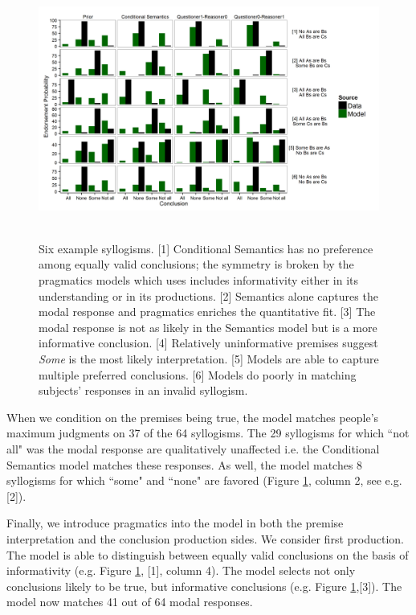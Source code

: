 \documentclass[10pt,letterpaper]{article}
\begin{document}
\begin{figure}
\centering
    \includegraphics[width=\textwidth,height=8.5cm]{fig1_multibar_qrm_alpha2}
    \caption{Six example syllogisms. 
    [1] Conditional Semantics has no preference among equally valid conclusions; the symmetry is broken by the pragmatics models which uses includes informativity either in its understanding or in its productions.     
    [2] Semantics alone captures the modal response and pragmatics enriches the quantitative fit.     
    [3] The modal response is not as likely in the Semantics model but is a more informative conclusion. [4] Relatively uninformative premises suggest \emph{Some} is the most likely interpretation. [5] Models are able to capture multiple preferred conclusions. [6] Models do poorly in matching subjects' responses in an invalid syllogism.}
  \label{fig:barplots}
\end{figure}


When we condition on the premises being true, the model matches people's maximum judgments on 37 of the 64 syllogisms. The 29 syllogisms for which ``not all" was the modal response are qualitatively unaffected i.e. the Conditional Semantics model matches these responses. As well, the model matches 8 syllogisms for which ``some" and ``none" are favored (Figure \ref{fig:barplots}, column 2, see e.g. [2]). 

Finally, we introduce pragmatics into the model in both the premise interpretation and the conclusion production sides. We consider first production. The model is able to distinguish between equally valid conclusions on the basis of informativity (e.g. Figure \ref{fig:barplots}, [1], column 4). The model selects not only conclusions likely to be true, but informative conclusions (e.g. Figure \ref{fig:barplots},[3]). The model now matches 41 out of 64 modal responses. 
\end{document}

